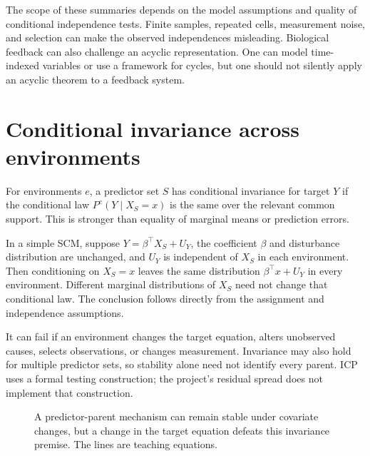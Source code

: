 \documentclass[11pt,oneside]{scrbook}
\begin{document}
The scope of these summaries depends on the model assumptions and quality of conditional
independence tests. Finite samples, repeated cells, measurement noise, and selection can
make the observed independences misleading. Biological feedback can also challenge an
acyclic representation. One can model time-indexed variables or use a framework for
cycles, but one should not silently apply an acyclic theorem to a feedback system.

\section{Conditional invariance across environments}
\begin{definition}
For environments $e$, a predictor set $S$ has conditional invariance for target $Y$
if the conditional law $P^e(Y\mid X_S=x)$ is the same over the relevant common support.
This is stronger than equality of marginal means or prediction errors.
\end{definition}

In a simple SCM, suppose
\(Y=\beta^\top X_S+U_Y\), the coefficient $\beta$ and disturbance distribution
are unchanged, and $U_Y$ is independent of $X_S$ in each environment. Then conditioning
on $X_S=x$ leaves the same distribution $\beta^\top x+U_Y$ in every environment.
Different marginal distributions of $X_S$ need not change that conditional law.
The conclusion follows directly from the assignment and independence assumptions.

It can fail if an environment changes the target equation, alters unobserved causes,
selects observations, or changes measurement. Invariance may also hold for multiple
predictor sets, so stability alone need not identify every parent. ICP uses a formal
testing construction; the project's residual spread does not implement that construction.

\begin{figure}[ht]
\centering
{}
\caption{A predictor-parent mechanism can remain stable under covariate changes,
but a change in the target equation defeats this invariance premise. The lines are teaching equations.}
\end{figure}
\end{document}
